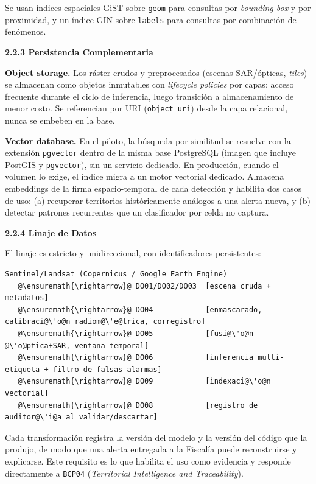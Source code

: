 \documentclass{article}
\newcommand{\mdhfour}[1]{\par\medskip\noindent\textbf{#1}\par\nobreak\smallskip}
\begin{document}
Se usan índices espaciales GiST sobre \texttt{geom} para consultas por \emph{bounding box} y por proximidad, y un índice GIN sobre \texttt{labels} para consultas por combinación de fenómenos.

\mdhfour{2.2.3 Persistencia Complementaria}

\textbf{Object storage.} Los ráster crudos y preprocesados (escenas SAR/ópticas, \emph{tiles}) se almacenan como objetos inmutables con \emph{lifecycle policies} por capas: acceso frecuente durante el ciclo de inferencia, luego transición a almacenamiento de menor costo. Se referencian por URI (\texttt{object\_\allowbreak{}uri}) desde la capa relacional, nunca se embeben en la base.

\textbf{Vector database.} En el piloto, la búsqueda por similitud se resuelve con la extensión \texttt{pgvector} dentro de la misma base PostgreSQL (imagen que incluye PostGIS y \texttt{pgvector}), sin un servicio dedicado. En producción, cuando el volumen lo exige, el índice migra a un motor vectorial dedicado. Almacena embeddings de la firma espacio-temporal de cada detección y habilita dos casos de uso: (a) recuperar territorios históricamente análogos a una alerta nueva, y (b) detectar patrones recurrentes que un clasificador por celda no captura.

\mdhfour{2.2.4 Linaje de Datos}

El linaje es estricto y unidireccional, con identificadores persistentes:

\begin{lstlisting}
Sentinel/Landsat (Copernicus / Google Earth Engine)
   @\ensuremath{\rightarrow}@ DO01/DO02/DO03  [escena cruda + metadatos]
   @\ensuremath{\rightarrow}@ DO04            [enmascarado, calibraci@\'o@n radiom@\'e@trica, corregistro]
   @\ensuremath{\rightarrow}@ DO05            [fusi@\'o@n @\'o@ptica+SAR, ventana temporal]
   @\ensuremath{\rightarrow}@ DO06            [inferencia multi-etiqueta + filtro de falsas alarmas]
   @\ensuremath{\rightarrow}@ DO09            [indexaci@\'o@n vectorial]
   @\ensuremath{\rightarrow}@ DO08            [registro de auditor@\'i@a al validar/descartar]
\end{lstlisting}

Cada transformación registra la versión del modelo y la versión del código que la produjo, de modo que una alerta entregada a la Fiscalía puede reconstruirse y explicarse. Este requisito es lo que habilita el uso como evidencia y responde directamente a \texttt{BCP04} (\emph{Territorial Intelligence and Traceability}).
\end{document}
